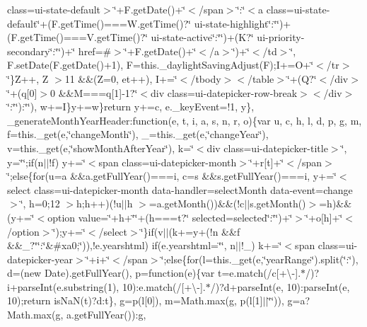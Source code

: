 {{\begin{DoxyParamCaption}
class=\textquotesingle{}ui-\/state-\/default\textquotesingle{}$>$\char`\"{}+\+F.\+get\+Date()+\char`\"{}$<$/span$>$\char`\"{}\+:\char`\"{}$<$a class=\textquotesingle{}ui-\/state-\/default\char`\"{}+(\+F.\+get\+Time()===\+W.\+get\+Time()?\char`\"{} ui-\/state-\/highlight\char`\"{}\+:\char`\"{}\char`\"{})+(\+F.\+get\+Time()===\+V.\+get\+Time()?\char`\"{} ui-\/state-\/active\char`\"{}\+:\char`\"{}\char`\"{})+(\+K?\char`\"{} ui-\/priority-\/secondary\char`\"{}\+:\char`\"{}\char`\"{})+\char`\"{}\textquotesingle{} href=\textquotesingle{}\#\textquotesingle{}$>$\char`\"{}+\+F.\+get\+Date()+\char`\"{}$<$/a$>$\char`\"{})+\char`\"{}$<$/td$>$\char`\"{}, F.\+set\+Date(\+F.\+get\+Date()+1), F=this.\+\_\+daylight\+Saving\+Adjust(\+F);\+I+=\+O+\char`\"{}$<$/tr$>$\char`\"{}\}\+Z++, Z $>$11 \&\&(\+Z=0, et++), I+=\char`\"{}$<$/tbody$>$$<$/table$>$\char`\"{}+(\+Q?\char`\"{}$<$/div$>$\char`\"{}+(q\mbox{[}0\mbox{]}$>$0 \&\&\+M===q\mbox{[}1\mbox{]}-\/1?\char`\"{}$<$div class=\textquotesingle{}ui-\/datepicker-\/row-\/break\textquotesingle{}$>$$<$/div$>$\char`\"{}\+:\char`\"{}\char`\"{})\+:\char`\"{}\char`\"{}), w+=\+I\}y+=w\}return y+=c, e.\+\_\+key\+Event=!1, y\}, \+\_\+generate\+Month\+Year\+Header\+:function(e, t, i, a, s, n, r, o)\{var u, c, h, l, d, p, g, m, f=this.\+\_\+get(e,\char`\"{}change\+Month\char`\"{}), \+\_\+=this.\+\_\+get(e,\char`\"{}change\+Year\char`\"{}), v=this.\+\_\+get(e,\char`\"{}show\+Month\+After\+Year\char`\"{}), k=\char`\"{}$<$div class=\textquotesingle{}ui-\/datepicker-\/title\textquotesingle{}$>$\char`\"{}, y=\char`\"{}\char`\"{};if(n$\vert$$\vert$!f) y+=\char`\"{}$<$span class=\textquotesingle{}ui-\/datepicker-\/month\textquotesingle{}$>$\char`\"{}+r\mbox{[}t\mbox{]}+\char`\"{}$<$/span$>$\char`\"{};else\{for(u=a \&\&a.\+get\+Full\+Year()===i, c=s \&\&s.\+get\+Full\+Year()===i, y+=\char`\"{}$<$select class=\textquotesingle{}ui-\/datepicker-\/month\textquotesingle{} data-\/handler=\textquotesingle{}select\+Month\textquotesingle{} data-\/event=\textquotesingle{}change\textquotesingle{}$>$\char`\"{}, h=0;12 $>$h;h++)(!u$\vert$$\vert$h $>$=a.\+get\+Month())\&\&(!c$\vert$$\vert$s.\+get\+Month()$>$=h)\&\&(y+=\char`\"{}$<$option value=\textquotesingle{}\char`\"{}+h+\char`\"{}\textquotesingle{}\char`\"{}+(h===t?\char`\"{} selected=\textquotesingle{}selected\textquotesingle{}\char`\"{}\+:\char`\"{}\char`\"{})+\char`\"{}$>$\char`\"{}+o\mbox{[}h\mbox{]}+\char`\"{}$<$/option$>$\char`\"{});y+=\char`\"{}$<$/select$>$\char`\"{}\}if(v$\vert$$\vert$(k+=y+(!n \&\&f \&\&\+\_\+?\char`\"{}\char`\"{}\+:\char`\"{}\&\#xa0;\char`\"{})),!e.\+yearshtml) if(e.\+yearshtml=\char`\"{}\char`\"{}, n$\vert$$\vert$!\+\_\+) k+=\char`\"{}$<$span class=\textquotesingle{}ui-\/datepicker-\/year\textquotesingle{}$>$\char`\"{}+i+\char`\"{}$<$/span$>$\char`\"{};else\{for(l=this.\+\_\+get(e,\char`\"{}year\+Range\char`\"{}).\+split(\char`\"{}\+:\char`\"{}), d=(new Date).\+get\+Full\+Year(), p=function(e)\{var t=e.\+match(/c\mbox{[}+\textbackslash{}-\/\mbox{]}.$\ast$/)?i+parse\+Int(e.\+substring(1), 10)\+:e.\+match(/\mbox{[}+\textbackslash{}-\/\mbox{]}.$\ast$/)?d+parse\+Int(e, 10)\+:parse\+Int(e, 10);return is\+Na\+N(t)?d\+:t\}, g=p(l\mbox{[}0\mbox{]}), m=\+Math.\+max(g, p(l\mbox{[}1\mbox{]}$\vert$$\vert$\char`\"{}\char`\"{})), g=a?\+Math.\+max(g, a.\+get\+Full\+Year())\+:g, 
\end{DoxyParamCaption}}}
